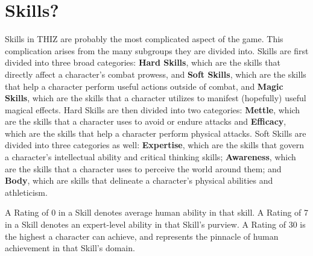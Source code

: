 \documentclass[oneside]{book}
\begin{document}
\section{Skills?}
Skills in THIZ are probably the most complicated aspect of the game. This complication arises from the many subgroups they are divided into. Skills are first divided into three broad categories: \textbf{Hard Skills}, which are the skills that directly affect a character's combat prowess, and \textbf{Soft Skills}, which are the skills that help a character perform useful actions outside of combat, and \textbf{Magic Skills}, which are the skills that a character utilizes to manifest (hopefully) useful magical effects. Hard Skills are then divided into two categories: \textbf{Mettle}, which are the skills that a character uses to avoid or endure attacks and \textbf{Efficacy}, which are the skills that help a character perform physical attacks. Soft Skills are divided into three categories as well: \textbf{Expertise}, which are the skills that govern a character's intellectual ability and critical thinking skills; \textbf{Awareness}, which are the skills that a character uses to perceive the world around them; and \textbf{Body}, which are skills that delineate a character's physical abilities and athleticism.

A Rating of 0 in a Skill denotes average human ability in that skill. A Rating of 7 in a Skill denotes an expert-level ability in that Skill's purview. A Rating of 30 is the highest a character can achieve, and represents the pinnacle of human achievement in that Skill's domain.
\end{document}
